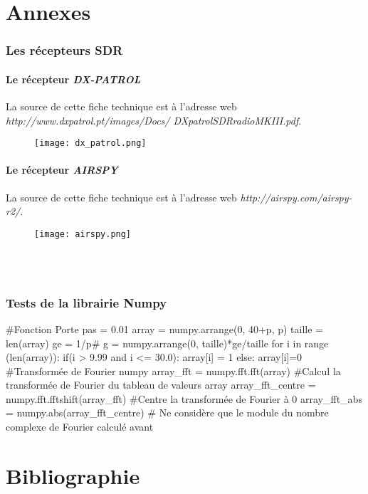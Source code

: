 \documentclass[12pt,fleqn]{book} %
\begin{document}
\setcounter{part}{-5}
\part{Annexes}
\setcounter{chapter}{0}
\setcounter{section}{0}
\section{Les récepteurs SDR}
\subsection{Le récepteur \emph{DX-PATROL}}
La source de cette fiche technique est à l'adresse web \emph{http://www.dxpatrol.pt/images/Docs/ DXpatrolSDRradioMKIII.pdf}.
\begin{figure}[H]
	\centering
	\texttt{[image: dx\_patrol.png]}
 \end{figure}
\subsection{Le récepteur \emph{AIRSPY}}
La source de cette fiche technique est à l'adresse web \emph{http://airspy.com/airspy-r2/}.
 \begin{figure}[H]
	\centering
	\texttt{[image: airspy.png]}
 \end{figure}
~\\\\
\section{Tests de la librairie Numpy}
\begin{python}
 #Fonction Porte
 pas = 0.01
 array = numpy.arrange(0, 40+p, p)
 taille = len(array)
 ge = 1/p#
 g = numpy.arrange(0, taille)*ge/taille
 for i in range (len(array)):
     if(i > 9.99 and i <= 30.0):
          array[i] = 1
      else:
          array[i]=0
 #Transformée de Fourier numpy
 array_fft = numpy.fft.fft(array) #Calcul la transformée de Fourier du tableau de valeurs array
 array_fft_centre = numpy.fft.fftshift(array_fft) #Centre la transformée de Fourier à 0
 array_fft_abs = numpy.abs(array_fft_centre) # Ne considère que le module du nombre complexe de Fourier calculé avant
\end{python}
\setcounter{part}{-6}
\part{Bibliographie}
\label{Sources}
\appendix
\end{document}
